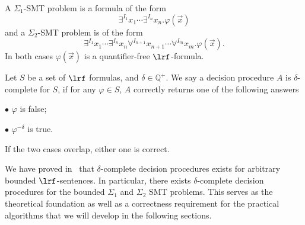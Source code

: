 \documentclass[11pt]{article}
\begin{document}
\begin{definition}
A $\Sigma_1$-SMT problem is a formula of the form
$$\exists^{I_1}x_1\cdots\exists^{I_n}x_n.\varphi(\vec x)$$
and a $\Sigma_2$-SMT problem is of the form
$$\exists^{I_1}x_1\cdots\exists^{I_n}x_n\forall^{I_{n+1}}x_{n+1}\cdots\forall^{I_{m}}x_m.\varphi(\vec x).$$
In both cases $\varphi(\vec x)$ is a quantifier-free $\lrf$-formula.
\end{definition}
\begin{definition}
Let $S$ be a set of $\lrf$ formulas, and $\delta\in \mathbb{Q}^+$. We say a decision procedure $A$ is $\delta$-complete for $S$, if for any $\varphi\in S$, $A$ correctly returns one of the following answers

$\bullet$ $\varphi$ is false;

$\bullet$ $\varphi^{-\delta}$ is true.

If the two cases overlap, either one is correct.
\end{definition}
We have proved in~\cite{DBLP:conf/lics/GaoAC12} that $\delta$-complete decision procedures exists for arbitrary bounded $\lrf$-sentences. In particular, there exists $\delta$-complete decision procedures for the bounded $\Sigma_1$ and $\Sigma_2$ SMT problems. This serves as the theoretical foundation as well as a correctness requirement for the practical algorithms that we will develop in the following sections.
\end{document}
